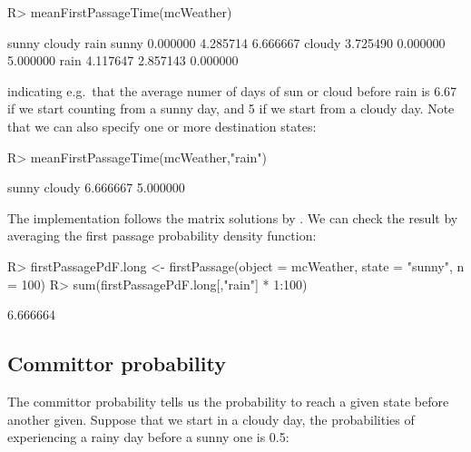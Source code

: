 \documentclass[article,nojss]{jss}
\begin{document}
\begin{CodeChunk}

\begin{CodeInput}
R> meanFirstPassageTime(mcWeather)
\end{CodeInput}

\begin{CodeOutput}
          sunny   cloudy     rain
sunny  0.000000 4.285714 6.666667
cloudy 3.725490 0.000000 5.000000
rain   4.117647 2.857143 0.000000
\end{CodeOutput}
\end{CodeChunk}

indicating e.g.~that the average numer of days of sun or cloud before rain is 6.67 if we start
counting from a sunny day, and 5 if we start from a cloudy day. Note that
we can also specify one or more destination states:

\begin{CodeChunk}

\begin{CodeInput}
R> meanFirstPassageTime(mcWeather,"rain")
\end{CodeInput}

\begin{CodeOutput}
   sunny   cloudy 
6.666667 5.000000 
\end{CodeOutput}
\end{CodeChunk}

The implementation follows the matrix solutions by \citep{GrinsteadSnell}. We can check the result by averaging the first passage probability density function:

\begin{CodeChunk}

\begin{CodeInput}
R> firstPassagePdF.long <- firstPassage(object = mcWeather, state = "sunny",  n = 100)
R> sum(firstPassagePdF.long[,"rain"] * 1:100)
\end{CodeInput}

\begin{CodeOutput}
[1] 6.666664
\end{CodeOutput}
\end{CodeChunk}

\hypertarget{committor-probability}{%
\subsection{Committor probability}\label{committor-probability}}

The committor probability tells us the probability to reach a given state before another given.
Suppose that we start in a cloudy day, the probabilities of experiencing a rainy day before
a sunny one is 0.5:
\end{document}
